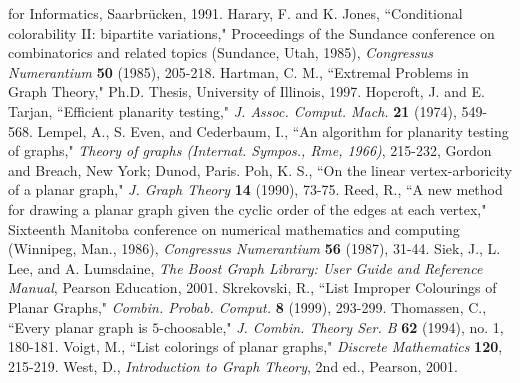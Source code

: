 \documentclass[letterpaper, 12pt]{article}
\theoremstyle{definition}
\theoremstyle{definition}
\theoremstyle{thm}
\theoremstyle{definition}
\begin{document}
\begin{thebibliography}{99}
	for Informatics, Saarbr{\"u}cken, 1991.
	Harary, F. and K. Jones, ``Conditional colorability II: bipartite variations,"
	Proceedings of the Sundance conference on combinatorics and related topics
	(Sundance, Utah, 1985), \textit{Congressus Numerantium} \textbf{50} (1985),
	205-218.
	Hartman, C. M.,
	``Extremal Problems in Graph Theory," Ph.D. Thesis, University of Illinois,
	1997.
	Hopcroft, J. and E. Tarjan, ``Efficient planarity testing," \textit{J. Assoc.
	Comput. Mach.} \textbf{21} (1974), 549-568.
	Lempel, A., S. Even, and Cederbaum, I., ``An algorithm for planarity testing of
	graphs," \textit{Theory of graphs (Internat. Sympos., Rme, 1966)}, 215-232,
	Gordon and Breach, New York; Dunod, Paris.
	Poh, K. S., ``On the linear vertex-arboricity of a planar graph,"
	\emph{J. Graph Theory} \textbf{14} (1990), 73-75.
	Reed, R., ``A new method for drawing a planar graph given the cyclic order of the
	edges at each vertex," Sixteenth Manitoba conference on numerical
	mathematics and computing (Winnipeg, Man., 1986), \textit{Congressus
	Numerantium} \textbf{56} (1987), 31-44.
	Siek, J., L. Lee, and A. Lumsdaine, \textit{The Boost Graph Library: User
	Guide and Reference Manual}, Pearson Education, 2001.
	Skrekovski, R., ``List Improper Colourings of Planar Graphs,"
	\textit{Combin. Probab. Comput.} \textbf{8} (1999), 293-299.
	Thomassen, C., ``Every planar graph is $5$-choosable,"
	\emph{J. Combin. Theory Ser. B} \textbf{62} (1994), no. 1, 180-181.
	Voigt, M., ``List colorings of planar graphs,"
	\textit{Discrete Mathematics} \textbf{120}, 215-219.
	West, D., \textit{Introduction to Graph Theory},
	2nd ed., Pearson, 2001.
\end{thebibliography}
\end{document}
